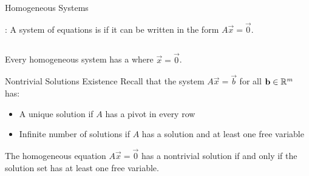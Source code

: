 \documentclass[xcoler=dvipsnames, aspectratio=169]{beamer}
\date{Homogeneous Systems}
\begin{document}
    \begin{frame}{Homogeneous Systems}
        \begin{definition}
            : A system of equations is  if it can be written
            in the form $A\vec{x}=\vec{0}$.
        \end{definition}
        \begin{example}
            \small
            \begin{columns}
                \iftoggle{showSolutions}{
                    \only<2->{
                        \rText{Not homogeneous!}
                    }
                }{}
                \iftoggle{showSolutions}{
                    \only<2->{
                        \rText{Yes it is homogeneous!}
                    }
                }{}
            \end{columns}
        \end{example}
        \pause\pause
        \begin{tcolorbox}
            Every homogeneous system has a  where $\vec{x}=\vec{0}$.
        \end{tcolorbox}
    \end{frame}
    \begin{frame}{Nontrivial Solutions Existence}
        Recall that the system $A\vec{x} = \vec{b}$ for all $\mathbf{b}\in\mathbb{R}^m$ has:
        \pause
        \begin{itemize}
            \item A unique solution if $A$ has a pivot in every row\pause
            \item Infinite number of solutions if $A$ has a solution and at least one free variable
        \end{itemize}
        \pause
        \vspace{100pt}
        \begin{theorem}
            The homogeneous equation $A\vec{x}=\vec{0}$ has a nontrivial solution if and only if
            the solution set has at least one free variable.
        \end{theorem}
    \end{frame}
\end{document}
